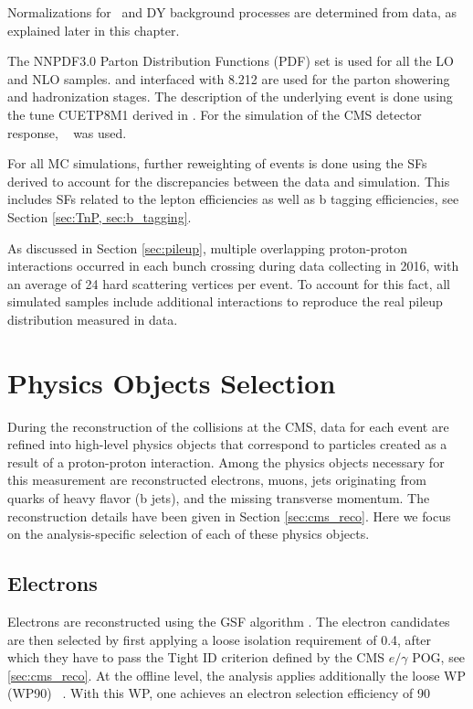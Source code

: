 Normalizations for \ttbar ~and DY background processes are determined from data, as explained later in this chapter.

The NNPDF3.0 \cite{Ball:2014uwa} Parton Distribution Functions
(PDF) set is used for all the LO and NLO samples. {\POWHEG} and {\MGMCatNLO} interfaced with
{\PYTHIA}8.212 are used for the parton
showering and hadronization stages. The description of the underlying event is done using the tune CUETP8M1 derived in \cite{Khachatryan:2015pea}. For the simulation of the CMS detector response, \GEANTfour~\cite{GEANT4} was used. 

For all MC simulations, further reweighting of events is done using the SFs derived to account for the discrepancies between the data and simulation. This includes SFs related to the lepton efficiencies as well as b tagging efficiencies, see Section \ref{sec:TnP, sec:b_tagging}.

As discussed in Section \ref{sec:pileup}, multiple overlapping proton-proton interactions occurred in each bunch crossing during data collecting in 2016, with an average of 24 hard scattering vertices per event. To account for this fact, all simulated samples include additional interactions to reproduce the real pileup distribution measured in data.

\section{Physics Objects Selection}
\label{sec:objects}


During the reconstruction of the collisions at the CMS, data for each event are refined into high-level physics objects that correspond to particles created as a result of a proton-proton interaction. Among the physics objects necessary for this measurement are reconstructed electrons, muons, jets originating from quarks of heavy flavor (b jets), and the missing transverse momentum. The reconstruction details have been given in Section \ref{sec:cms_reco}. Here we focus on the analysis-specific selection of each of these physics objects.

\subsection{Electrons}\label{sec:electrons}
Electrons are reconstructed using the GSF algorithm \cite{GSF}. The electron candidates are then selected by first applying a loose isolation requirement of 0.4, after which they have to pass the Tight ID criterion defined by the CMS $e/\gamma$ POG, see \ref{sec:cms_reco}. At the offline level, the analysis applies additionally the loose WP (WP90) ~\cite{vhbbAN}. With this WP, one achieves an electron selection efficiency of 90%


